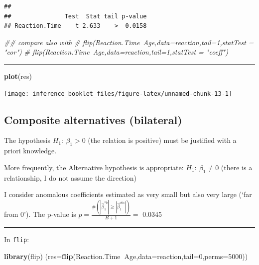 \documentclass[]{article}
\newenvironment{Shaded}{\begin{snugshade}}{\end{snugshade}}
\newcommand{\CommentTok}[1]{\textcolor[rgb]{0.56,0.35,0.01}{\textit{#1}}}
\newcommand{\DataTypeTok}[1]{\textcolor[rgb]{0.13,0.29,0.53}{#1}}
\newcommand{\DecValTok}[1]{\textcolor[rgb]{0.00,0.00,0.81}{#1}}
\newcommand{\KeywordTok}[1]{\textcolor[rgb]{0.13,0.29,0.53}{\textbf{#1}}}
\newcommand{\NormalTok}[1]{#1}
\newcommand{\OperatorTok}[1]{\textcolor[rgb]{0.81,0.36,0.00}{\textbf{#1}}}
\begin{document}
\begin{verbatim}
## 
##               Test  Stat tail p-value
## Reaction.Time    t 2.633    >  0.0158
\end{verbatim}

\begin{Shaded}
\begin{Highlighting}[]
\CommentTok{## compare also with}
\CommentTok{# flip(Reaction.Time~Age,data=reaction,tail=1,statTest = "cor")}
\CommentTok{# flip(Reaction.Time~Age,data=reaction,tail=1,statTest = "coeff")}
\end{Highlighting}
\end{Shaded}

\begin{center}\rule{0.5\linewidth}{\linethickness}\end{center}

\begin{Shaded}
\begin{Highlighting}[]
\KeywordTok{plot}\NormalTok{(res)}
\end{Highlighting}
\end{Shaded}

\begin{center}\texttt{[image: inference\_booklet\_files/figure-latex/unnamed-chunk-13-1]} \end{center}

\hypertarget{composite-alternatives-bilateral}{%
\subsection{Composite alternatives
(bilateral)}\label{composite-alternatives-bilateral}}

The hypothesis \(H_1: \ \beta_1 >0\) (the relation is positive) must be
justified with a priori knowledge.

More frequently, the Alternative hypothesis is appropriate:
\(H_1: \ \beta_1 \neq 0\) (there is a relationship, I do not assume the
direction)

I consider anomalous coefficients estimated as very small but also very
large (`far from 0'). The p-value is
\(p=\frac{\#(|\hat{\beta}_1^{*b} | \geq|\hat{\beta}_1^{obs}|)}{B+1}=\)
0.0345

\begin{center}\rule{0.5\linewidth}{\linethickness}\end{center}

In \texttt{flip}:

\begin{Shaded}
\begin{Highlighting}[]
\KeywordTok{library}\NormalTok{(flip)}
\NormalTok{(}\DataTypeTok{res=}\KeywordTok{flip}\NormalTok{(Reaction.Time}\OperatorTok{~}\NormalTok{Age,}\DataTypeTok{data=}\NormalTok{reaction,}\DataTypeTok{tail=}\DecValTok{0}\NormalTok{,}\DataTypeTok{perms=}\DecValTok{5000}\NormalTok{))}
\end{Highlighting}
\end{Shaded}
\end{document}
